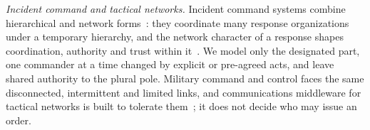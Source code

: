 \textit{Incident command and tactical networks.} Incident command systems combine
hierarchical and network forms~\cite{moynihan2008combining}: they coordinate many response
organizations under a temporary hierarchy, and the network character of a response shapes
coordination, authority and trust within it~\cite{moynihan2009network}. We model only the
designated part, one commander at a time changed by explicit or pre-agreed acts, and
leave shared authority to the plural pole. Military command and control faces the same
disconnected, intermittent and limited links, and communications middleware for tactical
networks is built to tolerate them~\cite{suri2009tactical}; it does not decide who may
issue an order. 

